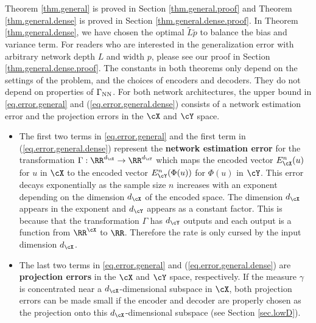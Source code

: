 \documentclass[11pt]{article} %
\begin{document}
Theorem \ref{thm.general} is proved in Section \ref{thm.general.proof} and Theorem \ref{thm.general.dense} is proved in Section \ref{thm.general.dense.proof}. In Theorem \ref{thm.general.dense}, we have chosen the optimal $\widetilde{L}\widetilde{p}$ to balance the bias and variance term. For readers who are interested in the generalization error with arbitrary network depth $L$ and width $p$, please see our proof in Section \ref{thm.general.dense.proof}. The constants in both theorems only depend on the settings of the problem, and the choices of encoders and decoders. They do not depend on properties of $\Gamma_{\rm NN}$.
For both network architectures, the upper bound in  \eqref{eq.error.general} and (\ref{eq.error.general.dense}) consists of a network estimation error and the projection errors in the $\cX$ and $\cY$ space.
\begin{itemize}
	\item The first two terms in \eqref{eq.error.general} and the first term in (\ref{eq.error.general.dense}) represent the {\bf network estimation error} for the transformation $\Gamma: \RR^{d_{\cX}} \rightarrow \RR^{d_{\cY}}$ which maps the encoded vector $E^n_{\cX}(u)$ for $u$ in $\cX$ to the encoded vector $E^n_{\cY}(\Phi(u))$ for $\Phi(u)$ in $\cY$. This error decays exponentially as the sample size $n$ increases with an exponent depending on the dimension $d_{\cX}$ of the encoded space. The dimension $d_{\cX}$ appears in the exponent and $d_{\cY}$ appears as a constant factor. This is because that the transformation $\Gamma$ has $d_{\cY}$ outputs and each output is a function from $\RR^{\cX}$ to $\RR$. Therefore the rate is only cursed by the input dimension $d_{\cX}$.
	
	\item The last two terms in \eqref{eq.error.general} and (\ref{eq.error.general.dense}) are {\bf projection errors} in the ${\cX}$ and ${\cY}$ space, respectively. If the measure $\gamma$ is concentrated near a $d_{\cX}$-dimensional subspace in $\cX$, both projection errors can be made small if the encoder and decoder are properly chosen as the projection onto this $d_{\cX}$-dimensional subspace (see Section \ref{sec.lowD}). 
	
\end{itemize}

\end{document}
